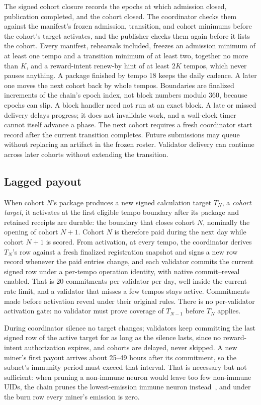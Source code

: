 The signed cohort closure records the epochs at which admission closed,
publication completed, and the cohort closed. The coordinator checks them
against the manifest's frozen admission, transition, and cohort minimums before
the cohort's target activates, and the publisher checks them again before it
lists the cohort. Every manifest, rehearsals included, freezes an
admission minimum of at least one tempo and a transition minimum of at least
two, together no more than \(K\), and a reward-intent renew-by hint of at least
\(2K\) tempos, which never pauses anything. A package finished by tempo 18 keeps the daily cadence. A later one
moves the next cohort back by whole tempos. Boundaries are finalized increments
of the chain's epoch index, not block numbers modulo 360, because epochs can
slip.
A block handler need not run at an exact block. A late or missed delivery delays
progress; it does not invalidate work, and a wall-clock timer cannot itself
advance a phase. The next cohort requires a fresh coordinator start record after
the current transition completes. Future submissions may queue without
replacing an artifact in the frozen roster. Validator delivery can continue
across later cohorts without extending the transition.

\subsection{Lagged payout}\label{lagged-payout}

When cohort \(N\)'s package produces a new signed calculation target \(T_N\), a
\emph{cohort target}, it activates at the first eligible
tempo boundary after its package and retained receipts are durable: the
boundary that closes cohort \(N\), nominally the
opening of cohort \(N+1\). Cohort \(N\) is therefore paid during the next day
while cohort \(N+1\) is scored. From activation, at every tempo, the coordinator
derives \(T_N\)'s row against a fresh finalized registration snapshot and signs
a new row record whenever the paid entries change, and each validator commits
the current signed row under a per-tempo operation identity, with native
commit--reveal enabled. That is 20 commitments per validator per day, well inside the current
rate limit, and a validator that misses a few tempos stays active. Commitments
made before activation reveal under their original rules. There is no
per-validator activation gate: no validator must prove coverage of \(T_{N-1}\)
before \(T_N\) applies.

During coordinator silence no target changes; validators keep committing the
last signed row of the active target for as long as the silence lasts, since no
reward-intent authorization expires, and cohorts are delayed,
never skipped. A new miner's first payout arrives about 25--49 hours after its
commitment, so the subnet's immunity period must exceed that interval. That is
necessary but not sufficient: when pruning a non-immune neuron would leave too
few non-immune UIDs, the chain prunes the lowest-emission immune neuron
instead~\cite{immunityperiod}, and under the burn row every miner's emission is
zero.


